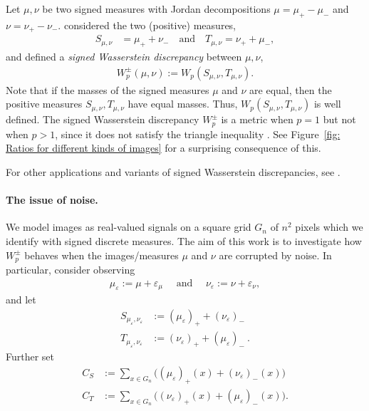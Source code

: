 \documentclass{article}
\theoremstyle{plain}
\theoremstyle{definition}
\theoremstyle{remark}
\begin{document}
Let $\mu, \nu$ be two signed measures with Jordan decompositions $\mu = \mu_+ - \mu_-$ and $\nu = \nu_+ - \nu_-$.
\citet{Mainini2012} considered the two (positive) measures,
\begin{align}
    \label{eq: Mainini positive-negative split}
    S_{\mu,\nu} &= \mu_+ + \nu_-
    \quad \text{and} \quad
    T_{\mu,\nu} = \nu_+ + \mu_-,
\end{align}
and defined a \emph{signed Wasserstein discrepancy}  between $\mu, \nu$,
\begin{align} \label{def:signed_Wasserstein}
    W^\pm_p (\mu, \nu)
    :=
    W_p(S_{\mu,\nu}, T_{\mu,\nu}).
\end{align}
Note that if the masses of the signed measures $\mu$ and $\nu$ are equal, then the positive measures $ S_{\mu,\nu}, T_{\mu,\nu} $ have equal masses. Thus, $W_p(S_{\mu,\nu}, T_{\mu,\nu})$ is well defined.
The signed Wasserstein discrepancy \( W^\pm_p \) is a metric when $p=1$ but not when $p>1$, since it does not satisfy the triangle inequality \citep[Proposition 3.4]{Mainini2012}.
See Figure~\ref{fig: Ratios for different kinds of images} for a surprising consequence of this.


For other applications and variants of signed Wasserstein discrepancies, see  \citet{GroppeNiemollerHundrieserVentzkeBlobEtAl2025,EngquistFroeseYang2016,ThorpeParkKolouriRohdeSlepcev2017}.

\paragraph{The issue of noise.}
We model images as real-valued signals on a square grid $G_n$ of $n^2$ pixels which we identify with signed discrete measures. 
The aim of this work is to investigate how $W^\pm_p$ behaves when the images/measures $\mu$ and $\nu$ are corrupted by noise. In particular, consider observing
\begin{align}
    \mu_\varepsilon
    :=
    \mu + \varepsilon_\mu 
    \quad \text{ and } \quad
    \nu_\varepsilon
    :=
    \nu +  \varepsilon_\nu,
\end{align}
and let
\begin{align}
    S_{\mu_\varepsilon, \nu_\varepsilon} &:= (\mu_\varepsilon)_+ + (\nu_\varepsilon)_-
    \\
    T_{\mu_\varepsilon, \nu_\varepsilon} &:= (\nu_\varepsilon)_+ + (\mu_\varepsilon)_-\ .
\end{align}
Further set 
\begin{align}
\label{eq: MasStd}
    C_S &:= \sum_{x \in G_n} \big( (\mu_\varepsilon)_+(x) + (\nu_\varepsilon)_-(x) \big) \\
    C_T &:= \sum_{x \in G_n} \big( (\nu_\varepsilon)_+(x) + (\mu_\varepsilon)_-(x) \big). 
\end{align}
\end{document}
